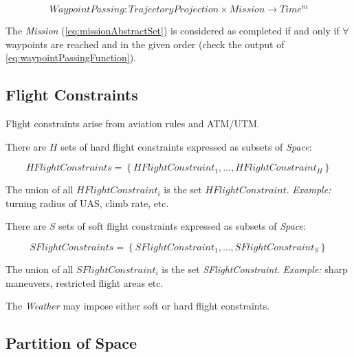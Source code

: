     \begin{equation}\label{eq:waypointPassingFunction}
        WaypointPassing:TrajectoryProjection \times Mission \to Time^m
    \end{equation}

    \begin{note}
        The \emph{Mission} (\ref{eq:missionAbstractSet}) is considered as completed if and only if $\forall$ waypoints are reached and in the given order (check the output of \ref{eq:waypointPassingFunction}).
    \end{note}



\subsection{Flight Constraints}\label{s:FlightConstraints}

    \noindent Flight constraints arise from aviation rules and ATM/UTM. 

    There are $H$ sets of hard flight constraints expressed as subsets of \emph{Space}:

    \begin{equation}\label{eq:HFlightConstraints}
        HFlightConstraints=\left\{HFlightConstraint_1, \dots, HFlightConstraint_H \right\}
    \end{equation}

    The union of all \emph{$HFlightConstraint_i$} is the set \emph{$HFlightConstraint$}. \emph{Example:} turning radius of UAS, climb rate, etc. 
    
    There are $S$ sets of soft flight constraints expressed as subsets of \emph{Space}:

    \begin{equation}\label{eq:SFlightConstraints}
        SFlightConstraints=\left\{SFlightConstraint_1, \dots, SFlightConstraint_S \right\}
    \end{equation}

    The union of all \emph{$SFlightConstraint_i$} is the set \emph{SFlightConstraint}. \emph{Example:} sharp maneuvers, restricted flight areas etc.

    The \emph{Weather} may impose either soft or hard flight constraints.



\subsection{Partition of Space}\label{s:partitionOfSpace}

